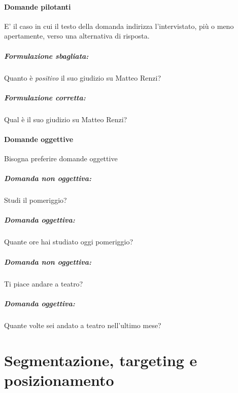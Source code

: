 \subsubsection{Domande pilotanti}
E’ il caso in cui il testo della domanda indirizza l’intervistato, più o meno apertamente, verso una alternativa di risposta.
\paragraph{Formulazione sbagliata:} Quanto è \textit{positivo} il suo giudizio su Matteo Renzi?

\paragraph{Formulazione corretta:} Qual è il suo giudizio su Matteo Renzi?

\subsubsection{Domande oggettive} 
Bisogna preferire domande oggettive
\paragraph{Domanda non oggettiva:} Studi il pomeriggio?
\paragraph{Domanda oggettiva:} Quante ore hai studiato oggi pomeriggio?
\paragraph{Domanda non oggettiva:} Ti piace andare a teatro?
\paragraph{Domanda oggettiva:} Quante volte sei andato a teatro nell'ultimo mese?

\chapter{Segmentazione, targeting e posizionamento}
